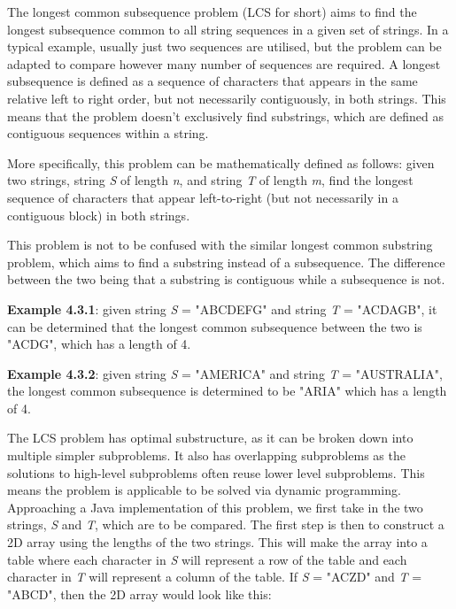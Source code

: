 The longest common subsequence problem (LCS for short) aims to find the longest subsequence common to all string sequences in a given set of strings. In a typical example, usually just two sequences are utilised, but the problem can be adapted to compare however many number of sequences are required. A longest subsequence is defined as a sequence of characters that appears in the same relative left to right order, but not necessarily contiguously, in both strings. This means that the problem doesn't exclusively find substrings, which are defined as contiguous sequences within a string. 

More specifically, this problem can be mathematically defined as follows: given two strings, string \textit{S} of length \textit{n}, and string \textit{T} of length \textit{m}, find the longest sequence of characters that appear left-to-right (but not necessarily in a contiguous block) in both strings. 

This problem is not to be confused with the similar longest common substring problem, which aims to find a substring instead of a subsequence. The difference between the two being that a substring is contiguous while a subsequence is not.

\medbreak
\textbf{Example 4.3.1}: given string \textit{S} = "ABCDEFG" and string \textit{T} = "ACDAGB", it can be determined that the longest common subsequence between the two is "ACDG", which has a length of 4.

\smallbreak
\textbf{Example 4.3.2}: given string \textit{S} = "AMERICA" and string \textit{T} = "AUSTRALIA", the longest common subsequence is determined to be "ARIA" which has a length of 4.

\medbreak\noindent
The LCS problem has optimal substructure, as it can be broken down into multiple simpler subproblems. It also has overlapping subproblems as the solutions to high-level subproblems often reuse lower level subproblems. This means the problem is applicable to be solved via dynamic programming. Approaching a Java implementation of this problem, we first take in the two strings, \textit{S} and \textit{T}, which are to be compared. The first step is then to construct a 2D array using the lengths of the two strings. This will make the array into a table where each character in \textit{S} will represent a row of the table and each character in \textit{T} will represent a column of the table. If \textit{S} = "ACZD" and \textit{T} = "ABCD", then the 2D array would look like this:


